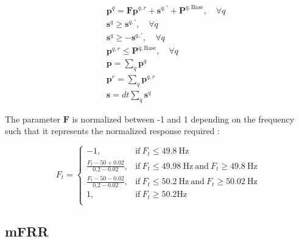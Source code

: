 \documentclass[sigconf]{acmart}
\begin{document}
\begin{subequations} \label{P1:constraints}
    \begin{align}
              & \bm{p}^{q} = \bm{F} \bm{p}^{q,r} + \bm{s}^{q, \prime} + \bm{P}^{q, \text{Base}}, \quad \forall{q}  \label{P1:co2} \\
        \quad & \bm{s}^{q} \geq \bm{s}^{q, \prime}, \quad \forall{q}  \label{P1:co3}
        \\
        \quad & \bm{s}^{q} \geq -\bm{s}^{q,\prime}, \quad \forall{q}  \label{P1:co4}
        \\
        \quad & \bm{p}^{q,r} \leq \bm{P}^{q,\text{Base}} , \quad \forall{q} \label{P1:co8}
        \\
        \quad & \bm{p} = \sum_{q} \bm{p}^{q}   \label{P1:co5}                                                                     \\
        \quad & \bm{p}^{r} = \sum_{q} \bm{p}^{q,r}   \label{P1:co6}                                                               \\
        \quad & \bm{s} = dt \sum_{q} \bm{s}^{q}   \label{P1:co7}
    \end{align}
\end{subequations}

The parameter $\bm{F}$ is normalized between -1 and 1 depending on the frequency such that it represents the normalized response required \cite{energinet:prequalification}:

\begin{equation}
    F_{t} =
    \begin{cases}
        -1,                             & \text{if}\ F_{t} \leq 49.8\ \text{Hz}                                          \\
        \frac{F_{t}-50+0.02}{0.2-0.02}, & \text{if}\ F_{t} \leq 49.98\ \text{Hz}\ \text{and}\ F_{t} \geq 49.8\ \text{Hz} \\
        \frac{F_{t}-50-0.02}{0.2-0.02}, & \text{if}\ F_{t} \leq 50.2\ \text{Hz}\ \text{and}\ F_{t} \geq 50.02\ \text{Hz} \\
        1,                              & \text{if}\ F_{t} \geq 50.2 \text{Hz}                                           \\
    \end{cases}
\end{equation}

\subsection{mFRR}
\end{document}
